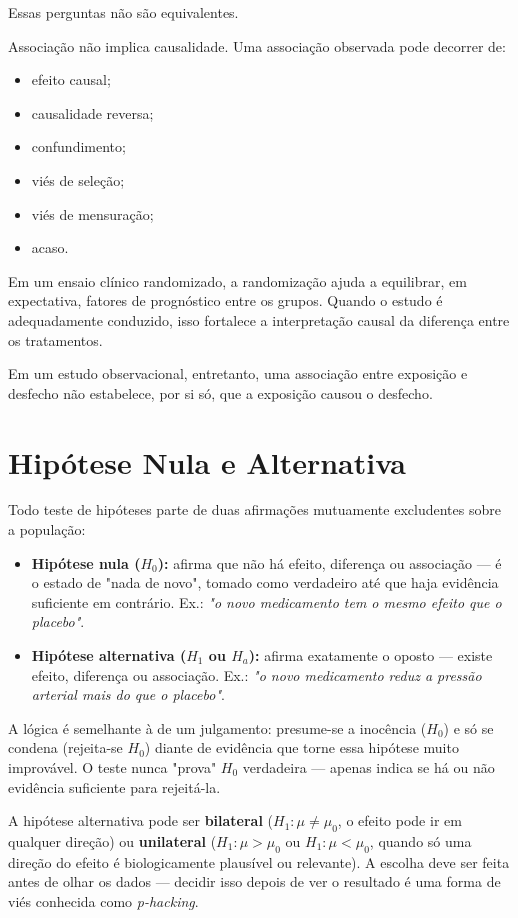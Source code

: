 Essas perguntas não são equivalentes.

Associação não implica causalidade. Uma associação observada pode decorrer de:

\begin{itemize}
    \item efeito causal;
    \item causalidade reversa;
    \item confundimento;
    \item viés de seleção;
    \item viés de mensuração;
    \item acaso.
\end{itemize}

Em um ensaio clínico randomizado, a randomização ajuda a equilibrar, em
expectativa, fatores de prognóstico entre os grupos. Quando o estudo é
adequadamente conduzido, isso fortalece a interpretação causal da diferença
entre os tratamentos.

Em um estudo observacional, entretanto, uma associação entre exposição e
desfecho não estabelece, por si só, que a exposição causou o desfecho.

\section{Hipótese Nula e Alternativa}
Todo teste de hipóteses parte de duas afirmações mutuamente excludentes sobre a população:
\begin{itemize}
    \item \textbf{Hipótese nula ($H_0$):} afirma que não há efeito, diferença ou associação --- é o estado de "nada de novo", tomado como verdadeiro até que haja evidência suficiente em contrário. Ex.: \emph{"o novo medicamento tem o mesmo efeito que o placebo"}.
    \item \textbf{Hipótese alternativa ($H_1$ ou $H_a$):} afirma exatamente o oposto --- existe efeito, diferença ou associação. Ex.: \emph{"o novo medicamento reduz a pressão arterial mais do que o placebo"}.
\end{itemize}

A lógica é semelhante à de um julgamento: presume-se a inocência ($H_0$) e só se condena (rejeita-se $H_0$) diante de evidência que torne essa hipótese muito improvável. O teste nunca "prova" $H_0$ verdadeira --- apenas indica se há ou não evidência suficiente para rejeitá-la.

\begin{error}
A hipótese alternativa pode ser \textbf{bilateral} ($H_1: \mu \neq \mu_0$, o efeito pode ir em qualquer direção) ou \textbf{unilateral} ($H_1: \mu > \mu_0$ ou $H_1: \mu < \mu_0$, quando só uma direção do efeito é biologicamente plausível ou relevante). A escolha deve ser feita antes de olhar os dados --- decidir isso depois de ver o resultado é uma forma de viés conhecida como \emph{p-hacking}.
\end{error}

